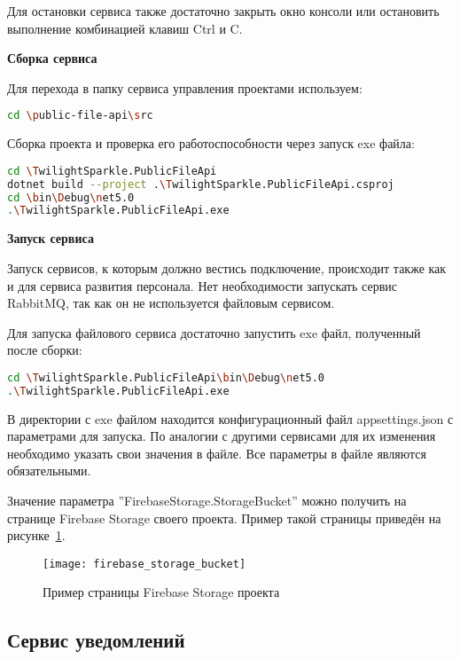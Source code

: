 Для остановки сервиса также достаточно закрыть окно консоли или остановить выполнение комбинацией клавиш Ctrl и C.

\bigskip
\textbf{Сборка сервиса}

Для перехода в папку сервиса управления проектами используем:

\begin{lstlisting}[language=bash]
cd \public-file-api\src
\end{lstlisting}

Сборка проекта и проверка его работоспособности через запуск exe файла:

\begin{lstlisting}[language=bash]
cd \TwilightSparkle.PublicFileApi
dotnet build --project .\TwilightSparkle.PublicFileApi.csproj
cd \bin\Debug\net5.0
.\TwilightSparkle.PublicFileApi.exe
\end{lstlisting}

\bigskip
\textbf{Запуск сервиса}

Запуск сервисов, к которым должно вестись подключение, происходит также как и для сервиса развития персонала. Нет необходимости запускать сервис RabbitMQ, так как он не используется файловым сервисом.

Для запуска файлового сервиса достаточно запустить exe файл, полученный после сборки:

\begin{lstlisting}[language=bash]
cd \TwilightSparkle.PublicFileApi\bin\Debug\net5.0
.\TwilightSparkle.PublicFileApi.exe
\end{lstlisting}

В директории с exe файлом находится конфигурационный файл appsettings.json с параметрами для запуска. По аналогии с другими сервисами для их изменения необходимо указать свои значения в файле. Все параметры в файле являются обязательными.

Значение параметра ''FirebaseStorage.StorageBucket'' можно получить на странице Firebase Storage своего проекта. Пример такой страницы приведён на рисунке~\ref{fig:firebase_storage_bucket}.

\begin{figure}[ht]
    \centering
    \texttt{[image: firebase\_storage\_bucket]}
    \caption{Пример страницы Firebase Storage проекта}\label{fig:firebase_storage_bucket}
\end{figure}


\subsection{Сервис уведомлений}

